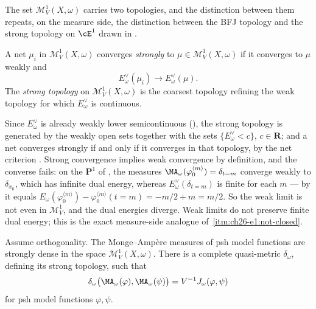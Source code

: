 The set \(\mathcal M^1_V(X,\omega)\) carries two topologies, and the
distinction between them repeats, on the measure side, the distinction
between the BFJ topology and the strong topology on \(\cE^1\) drawn in
.

\begin{definition}
\label{def:ch28-strong-measure-convergence}
A net \(\mu_i\) in \(\mathcal M^1_V(X,\omega)\) converges
\emph{strongly} to \(\mu\in\mathcal M^1_V(X,\omega)\) if it converges to
\(\mu\) weakly and
\begin{equation}
\label{eq:ch28-strong-measure-convergence}
                  E_\omega^\vee(\mu_i)\longrightarrow
                  E_\omega^\vee(\mu).
\end{equation}
The \emph{strong topology} on \(\mathcal M^1_V(X,\omega)\) is the coarsest
topology refining the weak topology for which \(E^\vee_\omega\) is
continuous.
\end{definition}

Since \(E^\vee_\omega\) is already weakly lower semicontinuous
(), the strong topology is generated by
the weakly open sets together with the sets
\(\{E^\vee_\omega<c\}\), \(c\in\mathbf R\); and a net converges strongly if
and only if it converges in that topology, by the net criterion
.  Strong convergence implies weak convergence by
definition, and the converse fails: on the \(\mathbf P^1\) of
, the measures
\(\MA_\omega(\varphi_0^{\langle m\rangle})=\delta_{t=m}\) converge weakly to
\(\delta_{x_0}\), which has infinite dual energy, whereas
\(E^\vee_\omega(\delta_{t=m})\) is finite for each \(m\) --- by
 it equals
\(E_\omega(\varphi_0^{\langle m\rangle})
-\varphi_0^{\langle m\rangle}(t=m)=-m/2+m=m/2\).  So the weak limit is not
even in \(\mathcal M^1_V\), and the dual energies diverge.  Weak limits do
not preserve finite dual energy; this is the exact measure-side analogue of
\,\cref{itm:ch26-e1:not-closed}.

\begin{theorem}
\label{thm:finite-energy-measure-completion}
Assume orthogonality.  The Monge--Amp\`ere measures of psh model functions
are strongly dense in the space \(\mathcal M^1_V(X,\omega)\).  There is a
complete quasi-metric \(\delta_\omega\), defining its strong topology, such
that
\begin{equation}
\label{eq:measure-dirichlet-quasimetric}
 \delta_\omega\bigl(\MA_\omega(\varphi),\MA_\omega(\psi)\bigr)
       =V^{-1}J_\omega(\varphi,\psi)
\end{equation}
for psh model functions \(\varphi,\psi\).
\end{theorem}

